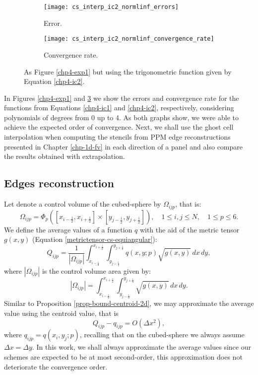 \begin{figure}[!htb]
	\centering
	\begin{subfigure}{0.45\textwidth}
		\centering
		\texttt{[image: cs\_interp\_ic2\_normlinf\_errors]}
		\caption{Error.\label{chp4-exp2-error}}
	\end{subfigure}
	\begin{subfigure}{0.45\textwidth}
		\centering
		\texttt{[image: cs\_interp\_ic2\_normlinf\_convergence\_rate]}
		\caption{Convergence rate.\label{chp4-exp2-CR}}
	\end{subfigure}
	\caption{As Figure \ref{chp4-exp1} but using the trigonometric function given by Equation \eqref{chp4-ic2}.\label{chp4-exp2}}
\end{figure}
\break
In Figures \ref{chp4-exp1} and \ref{chp4-exp2} we show the errors and convergence rate for the functions from Equations \eqref{chp4-ic1} and \eqref{chp4-ic2},
respectively, considering polynomials of degrees from 0 up to 4. As both graphs show, we were able to achieve the expected order of convergence.
Next, we shall use the ghost cell interpolation when computing the stencils from PPM edge reconstructions presented in Chapter \ref{chp-1d-fv}
in each direction of a panel and also compare the results obtained with extrapolation.

\subsection{Edges reconstruction}
\label{cs-recon}
Let denote a control volume of the cubed-sphere by $\Omega_{ijp}$, that is:
\begin{equation*}
	\Omega_{ijp} = \Phi_p([x_{i-\frac{1}{2}}, x_{i+\frac{1}{2}}] \times [y_{j-\frac{1}{2}}, y_{j+\frac{1}{2}}]),
	\quad 1 \leq i, j \leq N, \quad 1 \leq p \leq 6.
\end{equation*}
We define the average values of a function $q$ with the aid of the metric tensor $g(x,y)$ (Equation \ref{metrictensor-cs-equiangular}):
\begin{equation*}
	Q_{ijp} = \frac{1}{|\Omega_{ijp}|}\int_{x_{i-\frac{1}{2}}}^{x_{i+\frac{1}{2}}}
	\int_{y_{j-\frac{1}{2}}}^{y_{j+\frac{1}{2}}}  q(x,y;p) \sqrt{g(x,y)}\,dx \,dy,
\end{equation*}
where $|\Omega_{ijp}|$ is the control volume area given by:
\begin{equation*}
	|\Omega_{ijp}| = \int_{x_{i-\frac{1}{2}}}^{x_{i+\frac{1}{2}}} \int_{y_{j-\frac{1}{2}}}^{y_{j+\frac{1}{2}}}\sqrt{g(x,y)} \,dx \,dy.
\end{equation*}
Similar to Proposition \ref{prop-bound-centroid-2d}, we may approximate the average value using the centroid value, that is
\begin{equation*}
	Q_{ijp} - q_{ijp} = O(\Delta x ^2), 
\end{equation*}
where $q_{ijp} = q(x_i,y_j; p)$, recalling that on the cubed-sphere we always assume $\Delta x = \Delta y$.
In this work, we shall always approximate the average values since our schemes are expected to be at most second-order,
this approximation does not deteriorate the convergence order.

